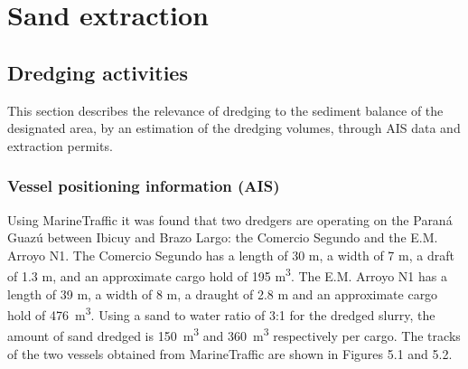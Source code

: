 \chapter{Sand extraction}
\section{Dredging activities}
This section describes the relevance of dredging to the sediment balance of the designated area, by an estimation of the dredging volumes, through AIS data and extraction permits.

\subsection{Vessel positioning information (AIS)}
Using MarineTraffic it was found that two dredgers are operating on the Paraná Guazú between Ibicuy and Brazo Largo: the Comercio Segundo and the E.M. Arroyo N1. The Comercio Segundo has a length of 30 m, a width of 7 m, a draft of 1.3 m, and an approximate cargo hold of 195 m\textsuperscript{3}. The E.M. Arroyo N1 has a length of 39 m, a width of 8 m, a draught of 2.8 m and an approximate cargo hold of 476 \,m\textsuperscript{3}. Using a sand to water ratio of 3:1 for the dredged slurry, the amount of sand dredged is 150 \,m\textsuperscript{3} and 360 \,m\textsuperscript{3} respectively per cargo. The tracks of the two vessels obtained from MarineTraffic are shown in Figures 5.1 and 5.2.

